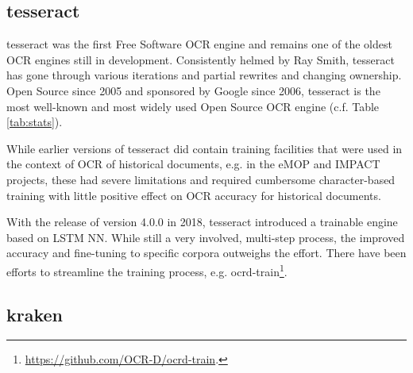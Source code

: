 \documentclass[conference]{IEEEtran}
\begin{document}

\subsection*{tesseract}

tesseract \cite{4376991} was the first Free Software OCR engine and remains one of
the oldest OCR engines still in development. Consistently helmed by Ray Smith,
tesseract has gone through various iterations and partial rewrites and changing
ownership. Open Source since 2005 and sponsored by Google since 2006, tesseract
is the most well-known and most widely used Open Source OCR engine
(c.f. Table \ref{tab:stats}).

While earlier versions of tesseract did contain training facilities that
were used in the context of OCR of historical documents, e.g. in the eMOP and
IMPACT projects, these had severe limitations and required cumbersome
character-based training with little positive effect on OCR accuracy
for historical documents.\cite{doi:10.1093/llc/fqv062}

With the release of version 4.0.0 in 2018, tesseract introduced a trainable
engine based on LSTM NN. While still a very involved, multi-step process, the
improved accuracy and fine-tuning to specific corpora outweighs the
effort. There have been efforts to streamline the training process, e.g. ocrd-train\footnote{\url{https://github.com/OCR-D/ocrd-train}.}.


\subsection*{kraken}
\end{document}
